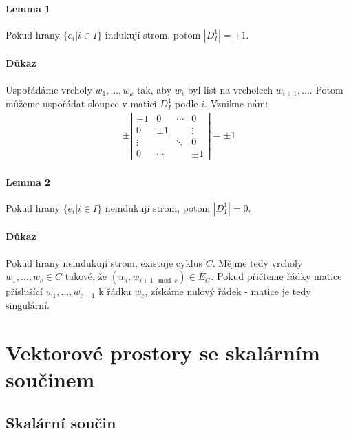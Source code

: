 \documentclass[a4paper,10pt]{article}
\begin{document}
\paragraph{Lemma 1}
Pokud hrany $\{e_i | i \in I\}$ indukují strom, potom $|D_I^1| = \pm 1$.
\paragraph{Důkaz}
Uspořádáme vrcholy $w_1, ..., w_k$ tak, aby $w_i$ byl list na vrcholech $w_{i+1},
...$. Potom můžeme uspořádat sloupce v matici $D_I^1$ podle $i$. Vznikne nám:
\begin{align}
	\pm
	\left|
	\begin{matrix}
		\pm 1 & 0 & \cdots & 0 \\
		0 & \pm 1 & & \vdots \\
		\vdots & & \ddots & 0 \\
		0 & \cdots & & \pm 1 
	\end{matrix}
	\right| = \pm 1
\end{align}
\paragraph{Lemma 2} Pokud hrany $\{e_i | i \in I\}$ neindukují strom, potom
$|D_I^1| = 0$.
\paragraph{Důkaz}
Pokud hrany neindukují strom, existuje cyklus $C$. Mějme tedy vrcholy $w_1, ...,
w_c \in C$ takové, že $(w_i, w_{i+1 \mod c}) \in E_G$. Pokud přičteme řádky
matice příslušící $w_1, ..., w_{c-1}$ k řádku $w_c$, 
získáme nulový řádek - matice je tedy singulární.


\newpage

\section{Vektorové prostory se skalárním součinem}
\setcounter{equation}{0}
\subsection{Skalární součin}
\setcounter{equation}{0}
\end{document}
